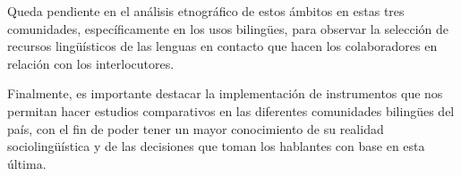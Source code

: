 \documentclass[output=paper]{../langscibook}
\begin{document}
Queda pendiente en el análisis etnográfico de estos ámbitos en estas tres comunidades, específicamente en los usos bilingües, para observar la selección de recursos lingüísticos de las lenguas en contacto que hacen los colaboradores en relación con los interlocutores.

  Finalmente, es importante destacar la implementación de instrumentos que nos permitan hacer estudios comparativos en las diferentes comunidades bilingües del país, con el fin de poder tener un mayor conocimiento de su realidad sociolingüística y de las decisiones que toman los hablantes con base en esta última.

\sloppy\printbibliography[heading=subbibliography,notkeyword=this]
\end{document}

